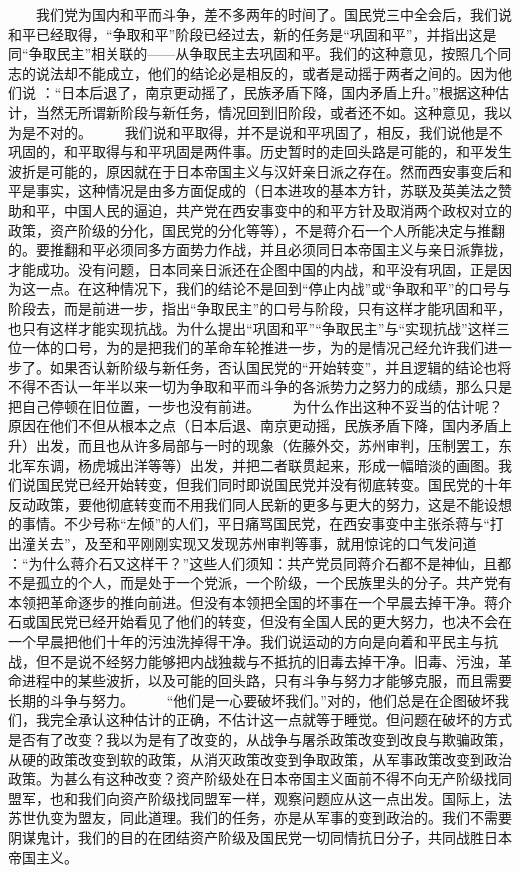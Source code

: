 \documentclass[twocolumn]{cvertbook}
\begin{document}
　　我们党为国内和平而斗争，差不多两年的时间了。国民党三中全会后，我们说和平已经取得，“争取和平”阶段已经过去，新的任务是“巩固和平”，并指出这是同“争取民主”相关联的——从争取民主去巩固和平。我们的这种意见，按照几个同志的说法却不能成立，他们的结论必是相反的，或者是动摇于两者之间的。因为他们说 ：“日本后退了，南京更动摇了，民族矛盾下降，国内矛盾上升。”根据这种估计，当然无所谓新阶段与新任务，情况回到旧阶段，或者还不如。这种意见，我以为是不对的。
　　我们说和平取得，并不是说和平巩固了，相反，我们说他是不巩固的，和平取得与和平巩固是两件事。历史暂时的走回头路是可能的，和平发生波折是可能的，原因就在于日本帝国主义与汉奸亲日派之存在。然而西安事变后和平是事实，这种情况是由多方面促成的（日本进攻的基本方针，苏联及英美法之赞助和平，中国人民的逼迫，共产党在西安事变中的和平方针及取消两个政权对立的政策，资产阶级的分化，国民党的分化等等），不是蒋介石一个人所能决定与推翻的。要推翻和平必须同多方面势力作战，并且必须同日本帝国主义与亲日派靠拢，才能成功。没有问题，日本同亲日派还在企图中国的内战，和平没有巩固，正是因为这一点。在这种情况下，我们的结论不是回到“停止内战”或“争取和平”的口号与阶段去，而是前进一步，指出“争取民主”的口号与阶段，只有这样才能巩固和平，也只有这样才能实现抗战。为什么提出“巩固和平”“争取民主”与“实现抗战”这样三位一体的口号，为的是把我们的革命车轮推进一步，为的是情况己经允许我们进一步了。如果否认新阶级与新任务，否认国民党的“开始转变”，并且逻辑的结论也将不得不否认一年半以来一切为争取和平而斗争的各派势力之努力的成绩，那么只是把自己停顿在旧位置，一步也没有前进。
　　为什么作出这种不妥当的估计呢？原因在他们不但从根本之点（日本后退、南京更动摇，民族矛盾下降，国内矛盾上升）出发，而且也从许多局部与一时的现象（佐藤外交，苏州审判，压制罢工，东北军东调，杨虎城出洋等等）出发，并把二者联贯起来，形成一幅暗淡的画图。我们说国民党已经开始转变，但我们同时即说国民党并没有彻底转变。国民党的十年反动政策，要他彻底转变而不用我们同人民新的更多与更大的努力，这是不能设想的事情。不少号称“左倾”的人们，平日痛骂国民党，在西安事变中主张杀蒋与“打出潼关去”，及至和平刚刚实现又发现苏州审判等事，就用惊诧的口气发问道 ：“为什么蒋介石又这样干？”这些人们须知：共产党员同蒋介石都不是神仙，且都不是孤立的个人，而是处于一个党派，一个阶级，一个民族里头的分子。共产党有本领把革命逐步的推向前进。但没有本领把全国的坏事在一个早晨去掉干净。蒋介石或国民党已经开始看见了他们的转变，但没有全国人民的更大努力，也决不会在一个早晨把他们十年的污浊洗掉得干净。我们说运动的方向是向着和平民主与抗战，但不是说不经努力能够把内战独裁与不抵抗的旧毒去掉干净。旧毒、污浊，革命进程中的某些波折，以及可能的回头路，只有斗争与努力才能够克服，而且需要长期的斗争与努力。
　　“他们是一心要破坏我们。”对的，他们总是在企图破坏我们，我完全承认这种估计的正确，不估计这一点就等于睡觉。但问题在破坏的方式是否有了改变？我以为是有了改变的，从战争与屠杀政策改变到改良与欺骗政策，从硬的政策改变到软的政策，从消灭政策改变到争取政策，从军事政策改变到政治政策。为甚么有这种改变？资产阶级处在日本帝国主义面前不得不向无产阶级找同盟军，也和我们向资产阶级找同盟军一样，观察问题应从这一点出发。国际上，法苏世仇变为盟友，同此道理。我们的任务，亦是从军事的变到政治的。我们不需要阴谋鬼计，我们的目的在团结资产阶级及国民党一切同情抗日分子，共同战胜日本帝国主义。
\end{document}
